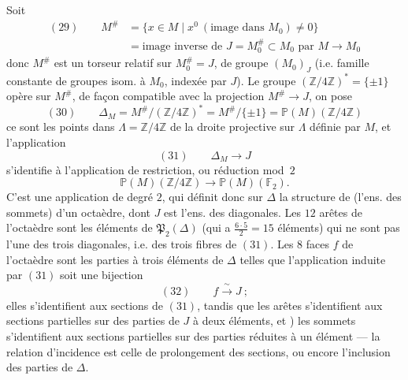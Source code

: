 \documentclass[11pt,a4paper]{article}
\begin{document}
Soit
\[
  \begin{aligned}
  (29) \qquad M^{\#} &= \{ x \in M \mid x^0 \ (\text{image dans } M_0) \neq 0 \} \\
  &= \text{image inverse de } J = M_0^{\#} \subset M_0 \text{ par } M \to M_0
  \end{aligned}
\]
 donc $M^{\#}$ est un torseur relatif sur $M_0^{\#} = J$, de groupe $(M_0)_J$ (i.e. famille constante de groupes isom. à $M_0$, indexée par $J$). Le groupe $(\mathbb{Z}/4\mathbb{Z})^* = \{\pm 1\}$ opère sur $M^{\#}$, de façon compatible avec la projection $M^{\#} \to J$, on pose
\[
  (30) \qquad \Delta_M = M^{\#}/(\mathbb{Z}/4\mathbb{Z})^* = M^{\#}/\{\pm 1\} = \mathbb{P}(M)(\mathbb{Z}/4\mathbb{Z})
\]
ce sont les points  dans $\Lambda = \mathbb{Z}/4\mathbb{Z}$ de la droite projective sur $\Lambda$ définie par $M$, et l'application  \struck{\ill{}}
\[
  (31) \qquad \Delta_M \longrightarrow J
\]
s'identifie à l'application de restriction, ou réduction mod~$2$
\[
  \mathbb{P}(M)(\mathbb{Z}/4\mathbb{Z}) \longrightarrow \mathbb{P}(M)(\mathbb{F}_2) .
\]
C'est une application de degré $2$, qui définit donc sur $\Delta$ la structure de (l'ens. des sommets) d'un octaèdre, dont $J$ est l'ens. des diagonales. Les $12$ arêtes de l'octaèdre sont les éléments de  $\mathfrak{P}_2(\Delta)$ (qui a $\frac{6 \cdot 5}{2} = 15$ éléments) qui ne sont pas  l'une des trois diagonales, i.e. des trois fibres de $(31)$. Les $8$ faces $f$ de l'octaèdre sont les parties à trois éléments de $\Delta$ telles que l'application induite par $(31)$ soit une bijection
\[
  (32) \qquad f \xrightarrow{\;\sim\;} J \ ;
\]
elles s'identifient aux sections de $(31)$, tandis que les arêtes s'identifient aux sections partielles sur des parties de $J$ à deux éléments, et 
) les sommets s'identifient aux sections partielles sur des parties  réduites à un élément --- la relation d'incidence est celle de prolongement des sections, ou encore l'inclusion des parties de $\Delta$.
\end{document}
